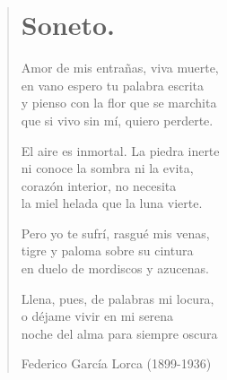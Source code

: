 \documentclass[12pt, twoside]{book}
\begin{document}
\begin{verse}
\begin{center}
\section{Soneto.}
\end{center}
Amor de mis entrañas, viva muerte,\\
en vano espero tu palabra escrita\\
y pienso con la flor que se marchita\\
que si vivo sin mí, quiero perderte.\newline

El aire es inmortal. La piedra inerte\\
ni conoce la sombra ni la evita,\\
corazón interior, no necesita\\
la miel helada que la luna vierte.\newline

Pero yo te sufrí, rasgué mis venas,\\
tigre y paloma sobre su cintura\\
en duelo de mordiscos y azucenas.\newline

Llena, pues, de palabras mi locura,\\
o déjame vivir en mi serena\\
noche del alma para siempre oscura\newline

Federico García Lorca (1899-1936)

\end{verse}
\newpage
\end{document}
